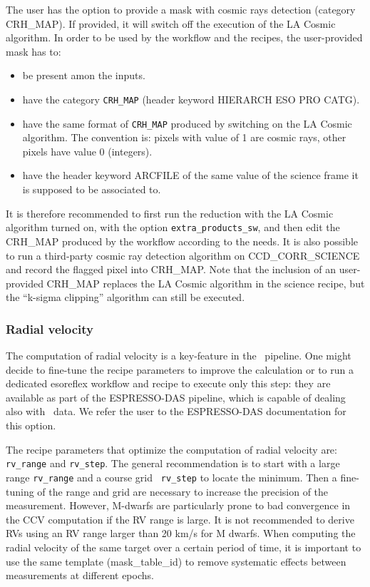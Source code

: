 The user has the option to provide a mask with cosmic rays detection (category CRH\_MAP). If provided, it will
switch off the execution of the LA Cosmic algorithm. In order to be used by the workflow and the recipes, the
user-provided mask has to:
\begin{itemize}
\item be present amon the inputs.
\item have the category {\tt CRH\_MAP} (header keyword HIERARCH ESO PRO CATG).
\item have the same format of {\tt CRH\_MAP} produced by switching on the LA Cosmic algorithm. The convention is: pixels
with value of 1 are cosmic rays, other pixels have value 0 (integers).
\item have the header keyword ARCFILE of the same value of the science frame it is supposed to be associated
  to.
  \end{itemize}
It is therefore recommended to first run the reduction with the LA Cosmic algorithm turned on, with the option
{\tt extra\_products\_sw}, and then edit the CRH\_MAP produced by the workflow according to the needs. It
is also possible to run a third-party cosmic ray detection algorithm on CCD\_CORR\_SCIENCE and record the
flagged pixel into CRH\_MAP.
Note that the inclusion of an user-provided CRH\_MAP replaces the LA Cosmic algorithm in the science recipe,
but the “k-sigma clipping” algorithm can still be executed.



\subsubsection{Radial velocity}
The computation of radial velocity is a key-feature in the
\pipename\ pipeline. One might decide to fine-tune the recipe
parameters to improve the calculation or to run a dedicated esoreflex
workflow and recipe to execute only this step: they are available as
part of the ESPRESSO-DAS pipeline, which is capable of dealing also
with \instname\ data. We refer the user to the ESPRESSO-DAS
documentation for this option.

The recipe parameters that optimize the computation of radial velocity
are: {\tt rv\_range} and {\tt rv\_step}. The general recommendation is
to start with a large range {\tt rv\_range} and a course grid {\tt
  rv\_step} to locate the minimum. Then a fine-tuning of the range and
grid are necessary to increase the precision of the measurement.
However, M-dwarfs are particularly prone to bad convergence in the CCV
computation if the RV range is large.  It is not recommended to derive
RVs using an RV range larger than 20 km/s for M dwarfs.  When
computing the radial velocity of the same target over a certain period
of time, it is important to use the same template (mask\_table\_id) to
remove systematic effects between measurements at different epochs.



